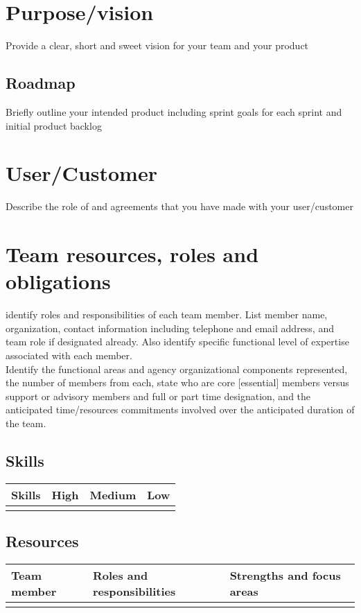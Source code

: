 \documentclass{article}
\begin{document}
\section{Purpose/vision}
Provide a clear, short and sweet vision for your team and your product
\subsection{Roadmap}
Briefly outline your intended product including sprint goals for each sprint and initial product backlog
\section{User/Customer}
Describe the role of and agreements that you have made with your user/customer
\section{Team resources, roles and obligations}
identify roles and responsibilities of each team member. List member name, organization, contact
information including telephone and email address, and team role if designated already. Also identify
specific functional level of expertise associated with each member.\\
Identify the functional areas and agency organizational components represented, the number of members
from each, state who are core [essential] members versus support or advisory members and full or part time
designation, and the anticipated time/resources commitments involved over the anticipated duration of the
team.

\subsection{Skills}
\begin{tabel}
    \centering
    \begin{tabular}{l|l|l|l}
        \rowcolor{Gray}
        \textbf{Skills} & \textbf{High} & \textbf{Medium} & \textbf{Low}\\\hline
                             & & &
    \end{tabular}
    \label{tab:Skillz}
\end{tabel}

\subsection{Resources}

\begin{tabel}
    \centering
    \begin{tabular}{l|l|l}
        \rowcolor{Gray}
        \textbf{Team member} & \textbf{Roles and responsibilities} & \textbf{Strengths and focus areas}\\\hline
                             & &
    \end{tabular}
    \label{tab:resources}
\end{tabel}
\end{document}
